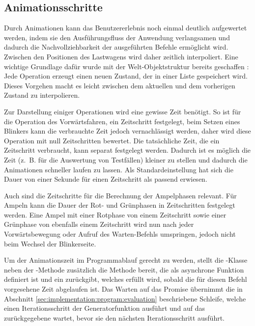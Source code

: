 \subsection{Animationsschritte}
\label{sec:implementation:rendering:animation}

Durch Animationen kann das Benutzererlebnis noch einmal deutlich aufgewertet werden, indem sie den Ausführungsfluss der Anwendung verlangsamen und dadurch die Nachvollziehbarkeit der ausgeführten Befehle ermöglicht wird. Zwischen den Positionen des Lastwagens wird daher zeitlich interpoliert. Eine wichtige Grundlage dafür wurde mit der Welt-Objektstruktur bereits geschaffen : Jede Operation erzeugt einen neuen Zustand, der in einer Liste gespeichert wird. Dieses Vorgehen macht es leicht zwischen dem aktuellen und dem vorherigen Zustand zu interpolieren.

Zur Darstellung einiger Operationen wird eine gewisse Zeit benötigt. So ist für die Operation des Vorwärtsfahren, ein Zeitschritt festgelegt, beim Setzen eines Blinkers kann die verbrauchte Zeit jedoch vernachlässigt werden, daher wird diese Operation mit null Zeitschritten bewertet. Die tatsächliche Zeit, die ein Zeitschritt verbraucht, kann separat festgelegt werden. Dadurch ist es möglich die Zeit (z.~B. für die Auswertung von Testfällen) kleiner zu stellen und dadurch die Animationen schneller laufen zu lassen. Als Standardeinstellung hat sich die Dauer von einer Sekunde für einen Zeitschritt als passend erwiesen.

Auch sind die Zeitschritte für die Berechnung der Ampelphasen relevant. Für Ampeln kann die Dauer der Rot- und Grünphasen in Zeitschritten festgelegt werden. Eine Ampel mit einer Rotphase von einem Zeitschritt sowie einer Grünphase von ebenfalls einem Zeitschritt wird nun nach jeder Vorwärtsbewegung oder Aufruf des Warten-Befehls umspringen, jedoch nicht beim Wechsel der Blinkerseite.

Um der Animationszeit im Programmablauf gerecht zu werden, stellt die -Klasse neben der -Methode zusätzlich die Methode  bereit, die als asynchrone Funktion definiert ist und ein  zurückgibt, welches erfüllt wird, sobald die für diesen Befehl vorgesehene Zeit abgelaufen ist. Das Warten auf das Promise übernimmt die in Abschnitt \ref{sec:implementation:program:evaluation} beschriebene Schleife, welche einen Iterationsschritt der Generatorfunktion ausführt und auf das zurückgegebene  wartet, bevor sie den nächsten Iterationsschritt ausführt.

